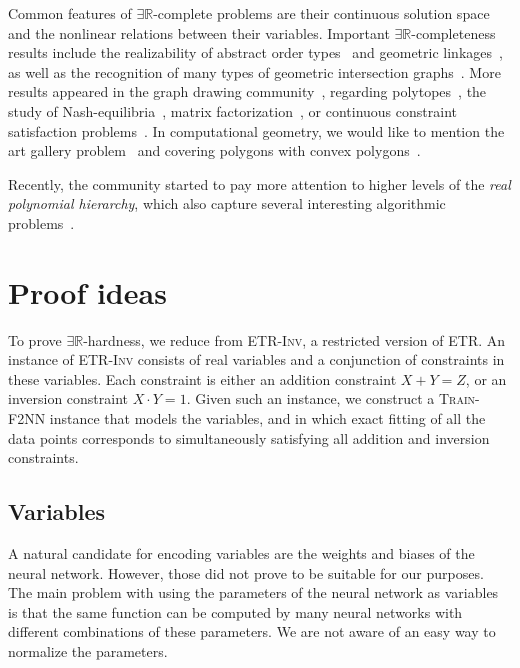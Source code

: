 \documentclass[11pt]{article}
\numberwithin{equation}{section}
\theoremstyle{definition}
\theoremstyle{plain}
\newcommand{\R}{\mathbb R}
\newcommand{\ER}{\texorpdfstring{\ensuremath{\exists\R}}{ER}\xspace}
\newcommand{\problemname}[1]{\textnormal{\textsc{#1}}\xspace}
\newcommand{\ETR}{\problemname{ETR}}
\newcommand{\trainNN}{\problemname{Train-F2NN}}
\newcommand{\ETRINV}{\problemname{ETR-Inv}}
\theoremstyle{plain}
\begin{document}
Common features of \ER-complete problems are their continuous solution space and the nonlinear relations between their variables.
Important \ER-completeness results include the realizability of abstract order types~\cite{Mnev1988_UniversalityTheorem, Shor1991_Stretchability} and geometric linkages~\cite{Schaefer2013_Realizability}, as well as the recognition of many types of geometric intersection graphs~\cite{Cardinal2018_Intersection,Kang2012_Sphere,Kratochvil1994_IntersectionGraphs, Matousek2014_IntersectionGraphsER,McDiarmid2013_DiskSegmentGraphs}.
More results appeared in the graph drawing community~\cite{Dobbins2023_AreaUniversality, Jungeblut2024_Lombardi, Lubiw2022_DrawingInPolygonialRegion, Schaefer2021_FixedK, Schaefer2023_RAC}, regarding polytopes~\cite{Richter1995_Polytopes}, the study of Nash-equilibria~\cite{Berthelsen2022_MultiPlayerNash, Bilo2021_Nash, Garg2018_MultiPlayer, Schaefer2017_FixedPointsNash}, matrix factorization~\cite{Chistikov2016_Matrix, Schaefer2018_TensorRank, Shitov2017_PSMatrixFactorization}, or continuous constraint satisfaction problems~\cite{Miltzow2022_ContinuousCSP}.
In computational geometry, we would like to mention the art gallery problem~\cite{Abrahamsen2022_ArtGallery, Stade2023_ArtGallery} and covering polygons with convex polygons~\cite{Abrahamsen2022_Covering}.

Recently, the community started to pay more attention to higher levels of the \emph{real polynomial hierarchy}, which also capture several interesting algorithmic problems~\cite{Blanc2021_ESS, Burgisser2009_ExoticQuantifiers, DCosta2021_EscapeProblem, Dobbins2023_AreaUniversality, Jungeblut2024_Hausdorff, Schaefer2023_RealHierarchy}.

\section{Proof ideas}
\label{sec:key_ideas}

To prove \ER-hardness, we reduce from \ETRINV, a restricted version of \ETR.
An instance of \ETRINV consists of real variables and a conjunction of constraints in these variables.
Each constraint is either an addition constraint $X + Y = Z$, or an inversion constraint $X \cdot Y = 1$.
Given such an instance, we construct a \trainNN instance that models the variables, and in which exact fitting of all the data points corresponds to simultaneously satisfying all addition and inversion constraints.

\subsection{Variables}   %
A natural candidate for encoding variables are the weights and biases of the neural network.
However, those did not prove to be suitable for our purposes.
The main problem with using the parameters of the neural network as variables is that the same function can be computed by many neural networks with different combinations of these parameters.
We are not aware of an easy way to normalize the parameters.
\end{document}
